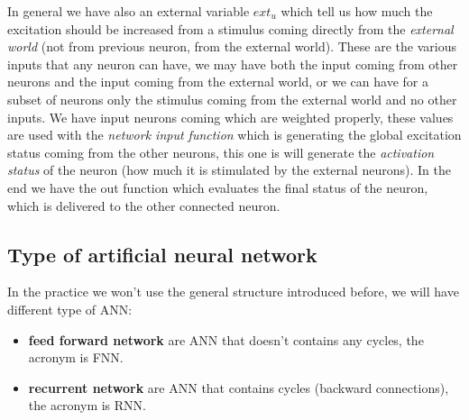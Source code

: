 \documentclass{article}
\begin{document}
In general we have also an external variable $ext_u$ which tell us how much the excitation
should be increased from a stimulus coming directly from the \textit{external world}
(not from previous neuron, from the external world).
\newline\newline
These are the various inputs that any neuron can have, we may have both the input coming
from other neurons and the input coming from the external world, or we can have for a subset
of neurons only the stimulus coming from the external world and no other inputs.
\newline\newline
We have input neurons coming which are weighted properly, these values are used
with the \textit{network input function} which is generating the global excitation status
coming from the other neurons, this one is will generate the \textit{activation status} of the neuron (how much it is
stimulated by the external neurons).
\newline\newline
In the end we have the out function which evaluates the final status of the neuron, which
is delivered to the other connected neuron.

\subsection{Type of artificial neural network}
In the practice we won't use the general structure introduced before, we will have
different type of ANN:

\begin{itemize}
    \item \textbf{feed forward network} are ANN that doesn't contains any cycles, the
          acronym is FNN.
    \item \textbf{recurrent network} are ANN that contains cycles (backward connections),
          the acronym is RNN.
\end{itemize}
\end{document}
